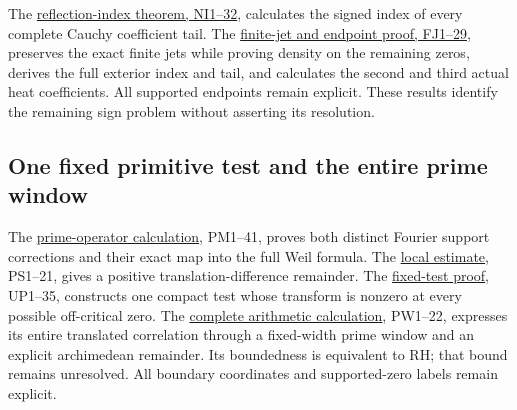 \documentclass[
  10pt,
  a4paper,
]{article}
\begin{document}
The \href{CAUCHY_REFLECTION_INDEX_DERIVATION.md}{reflection-index
theorem, NI1--32}, calculates the signed index of every complete Cauchy
coefficient tail. The
\href{FINITE_JET_COMPLEMENT_AND_HEAT_TRUNCATION.md}{finite-jet and
endpoint proof, FJ1--29}, preserves the exact finite jets while proving
density on the remaining zeros, derives the full exterior index and
tail, and calculates the second and third actual heat coefficients. All
supported endpoints remain explicit. These results identify the
remaining sign problem without asserting its resolution.

\subsection{One fixed primitive test and the entire prime
window}\label{one-fixed-primitive-test-and-the-entire-prime-window}

The \href{PRIME_PROJECTOR_MOBIUS_DERIVATION.md}{prime-operator
calculation}, PM1--41, proves both distinct Fourier support corrections
and their exact map into the full Weil formula. The
\href{PRIMITIVE_SHORT_SUPPORT_DERIVATION.md}{local estimate}, PS1--21,
gives a positive translation-difference remainder. The
\href{UNIVERSAL_PRIMITIVE_TRANSLATION_CRITERION.md}{fixed-test proof},
UP1--35, constructs one compact test whose transform is nonzero at every
possible off-critical zero. The
\href{PRIMITIVE_PRIME_WINDOW_DERIVATION.md}{complete arithmetic
calculation}, PW1--22, expresses its entire translated correlation
through a fixed-width prime window and an explicit archimedean
remainder. Its boundedness is equivalent to RH; that bound remains
unresolved. All boundary coordinates and supported-zero labels remain
explicit.
\end{document}
